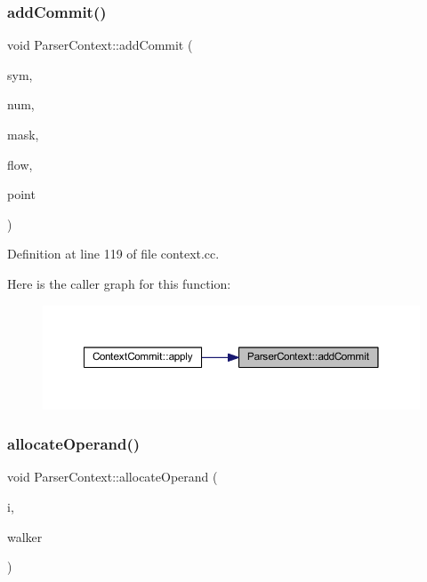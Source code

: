 \subsubsection{\texorpdfstring{addCommit()}{addCommit()}}
{\footnotesize\ttfamily void Parser\+Context\+::add\+Commit (\begin{DoxyParamCaption}\item[{\mbox{\hyperlink{class_triple_symbol}{Triple\+Symbol}} $\ast$}]{sym,  }\item[{int4}]{num,  }\item[{uintm}]{mask,  }\item[{bool}]{flow,  }\item[{\mbox{\hyperlink{struct_construct_state}{Construct\+State}} $\ast$}]{point }\end{DoxyParamCaption})}



Definition at line 119 of file context.\+cc.

Here is the caller graph for this function\+:
\nopagebreak
\begin{figure}[H]
\begin{center}
\leavevmode
\includegraphics[width=350pt]{class_parser_context_a26c3fe0af432d556742152f7049dfcb9_icgraph}
\end{center}
\end{figure}
\mbox{\label{class_parser_context_a93151174575222516e445bd6a06cb93c}} 
\subsubsection{\texorpdfstring{allocateOperand()}{allocateOperand()}}
{\footnotesize\ttfamily void Parser\+Context\+::allocate\+Operand (\begin{DoxyParamCaption}\item[{int4}]{i,  }\item[{\mbox{\hyperlink{class_parser_walker_change}{Parser\+Walker\+Change}} \&}]{walker }\end{DoxyParamCaption})\hspace{0.3cm}{\ttfamily [inline]}}




